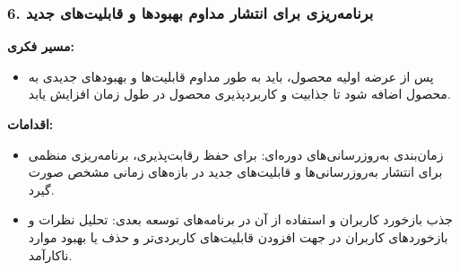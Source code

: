 \subsubsection*{6. برنامه‌ریزی برای انتشار مداوم بهبودها و قابلیت‌های جدید}

\textbf{مسیر فکری:}

\begin{itemize}
    \item پس از عرضه اولیه محصول، باید به طور مداوم قابلیت‌ها و بهبودهای جدیدی به محصول اضافه شود تا جذابیت و کاربردپذیری محصول در طول زمان افزایش یابد.
\end{itemize}

\textbf{اقدامات:}

\begin{itemize}
    \item زمان‌بندی به‌روزرسانی‌های دوره‌ای: برای حفظ رقابت‌پذیری، برنامه‌ریزی منظمی برای انتشار به‌روزرسانی‌ها و قابلیت‌های جدید در بازه‌های زمانی مشخص صورت گیرد.
    \item جذب بازخورد کاربران و استفاده از آن در برنامه‌های توسعه بعدی: تحلیل نظرات و بازخوردهای کاربران در جهت افزودن قابلیت‌های کاربردی‌تر و حذف یا بهبود موارد ناکارآمد.
\end{itemize}
